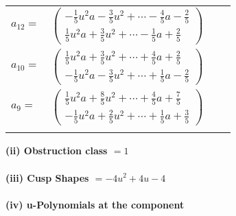 \documentclass[1p]{elsarticle_modified}
\theoremstyle{definition}
\begin{document}
\begin{tabular}{m{7pt} m{180pt} m{7pt} m{180pt} }
\flushright $a_{12}=$&$\begin{pmatrix}-\frac{1}{5} u^2 a-\frac{3}{5} u^2+\cdots-\frac{4}{5} a-\frac{2}{5}\\\frac{1}{5} u^2 a+\frac{3}{5} u^2+\cdots-\frac{1}{5} a+\frac{2}{5}\end{pmatrix}$ \\
\flushright $a_{10}=$&$\begin{pmatrix}\frac{1}{5} u^2 a+\frac{3}{5} u^2+\cdots+\frac{4}{5} a+\frac{2}{5}\\-\frac{1}{5} u^2 a-\frac{3}{5} u^2+\cdots+\frac{1}{5} a-\frac{2}{5}\end{pmatrix}$ \\
\flushright $a_{9}=$&$\begin{pmatrix}\frac{1}{5} u^2 a+\frac{8}{5} u^2+\cdots+\frac{4}{5} a+\frac{7}{5}\\-\frac{1}{5} u^2 a+\frac{2}{5} u^2+\cdots+\frac{1}{5} a+\frac{3}{5}\end{pmatrix}$\\&\end{tabular}
\flushleft \textbf{(ii) Obstruction class $= 1$}\\~\\
\flushleft \textbf{(iii) Cusp Shapes $= -4 u^2+4 u-4$}\\~\\
\newpage\renewcommand{\arraystretch}{1}
\flushleft \textbf{(iv) u-Polynomials at the component}\newline \\
\end{document}
